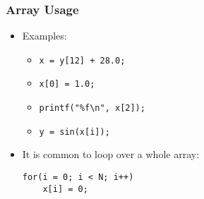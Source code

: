 \documentclass[14pt]{beamer}
\begin{document}
\begin{frame}[fragile]
\frametitle{Array Usage}
\begin{itemize}
\item Examples:
	\begin{itemize}
		\item \texttt{x = y[12] + 28.0;}
		\item \texttt{x[0] = 1.0;}
		\item \texttt{printf("\%f\textbackslash n", x[2]);}
		\item \texttt{y = sin(x[i]);}
	\end{itemize}
\pause
\item It is common to loop over a whole array:
\begin{lstlisting}[style=Ctable]
for(i = 0; i < N; i++)
	x[i] = 0;
\end{lstlisting}
\end{itemize}
\end{frame}
\end{document}
